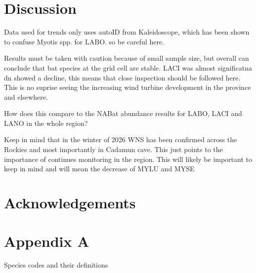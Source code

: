 \documentclass[
  letterpaper,
  DIV=11,
  numbers=noendperiod]{scrartcl}
\begin{document}
\section{Discussion}\label{discussion}

Data used for trends only uses autoID from Kaleidoscope, which has been
shown to confuse Myotis spp. for LABO. so be careful here.

Results must be taken with caution because of small sample size, but
overall can conclude that bat species at the grid cell are stable. LACI
was almost significatna dn showed a decline, this means that close
inspection should be followed here. This is no suprise seeing the
increasing wind turbine development in the province and elsewhere.

How does this compare to the NABat abundance results for LABO, LACI and
LANO in the whole region?

Keep in mind that in the winter of 2026 WNS has been confirmed across
the Rockies and most importantly in Cadamun cave. This just points to
the importance of continues monitoring in the region. This will likely
be important to keep in mind and will mean the decrease of MYLU and MYSE

\section{Acknowledgements}\label{acknowledgements}

\newpage{}

\section{Appendix A}\label{appendix-a}

Species codes and their definitions

\begingroup\fontsize{9}{11}\selectfont
\end{document}
